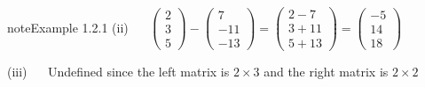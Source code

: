 \documentclass[letterpaper,10pt,english]{jupyterBook}
\begin{document}
\begin{sphinxadmonition}{note}{Example 1.2.1}
\sphinxAtStartPar
(ii)   \( \begin{pmatrix} 2 \\ 3 \\ 5 \end{pmatrix} - \begin{pmatrix} 7 \\ -11 \\ -13 \end{pmatrix} = \begin{pmatrix}2 - 7 \\ 3 + 11 \\ 5 + 13 \end{pmatrix} = \begin{pmatrix} -5 \\ 14 \\ 18\end{pmatrix} \)

\sphinxAtStartPar
(iii)   Undefined since the left matrix is \(2\times 3\) and the right matrix is \(2\times 2\)
\end{sphinxadmonition}

\ignorespaces 
\end{document}
